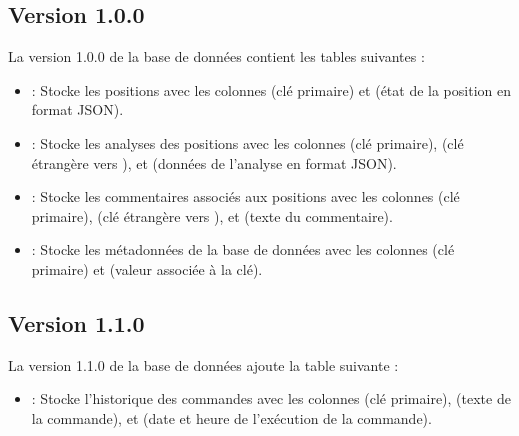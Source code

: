 \documentclass[letterpaper,10pt,french]{sphinxmanual}
\begin{document}
\subsection{Version 1.0.0}
\label{\detokenize{annexe_db_scheme:version-1-0-0}}
\sphinxAtStartPar
La version 1.0.0 de la base de données contient les tables suivantes :
\begin{itemize}
\item {} 
\sphinxAtStartPar
{} : Stocke les positions avec les colonnes  (clé primaire) et  (état de la position en format JSON).

\item {} 
\sphinxAtStartPar
{} : Stocke les analyses des positions avec les colonnes  (clé primaire),  (clé étrangère vers ), et  (données de l’analyse en format JSON).

\item {} 
\sphinxAtStartPar
{} : Stocke les commentaires associés aux positions avec les colonnes  (clé primaire),  (clé étrangère vers ), et  (texte du commentaire).

\item {} 
\sphinxAtStartPar
{} : Stocke les métadonnées de la base de données avec les colonnes  (clé primaire) et  (valeur associée à la clé).

\end{itemize}


\subsection{Version 1.1.0}
\label{\detokenize{annexe_db_scheme:version-1-1-0}}
\sphinxAtStartPar
La version 1.1.0 de la base de données ajoute la table suivante :
\begin{itemize}
\item {} 
\sphinxAtStartPar
{} : Stocke l’historique des commandes avec les colonnes  (clé primaire),  (texte de la commande), et  (date et heure de l’exécution de la commande).

\end{itemize}
\end{document}
